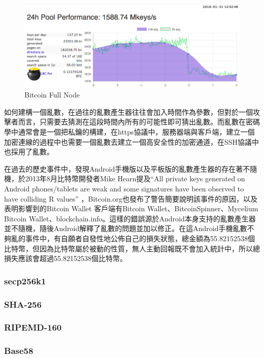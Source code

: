 			\begin{figure}[h]
				\centering
				\includegraphics[width = .9\textwidth]{LBC.png}
				\caption{Bitcoin Full Node\parencite{TheLargeBitcoinCollider}}\label{LBC}
			\end{figure}

			如何建構一個亂數，在過往的亂數產生器往往會加入時間作為參數，但對於一個攻擊者而言，只需要去猜測在這段時間內所有的可能性即可猜出亂數。而亂數在密碼學中通常會是一個把私鑰的構建，在https協議中，服務器端與客戶端，建立一個加密連線的過程中也需要一個亂數去建立一個高安全性的加密通道，在SSH協議中也採用了亂數。
	
			在過去的歷史事件中，發現Android手機版以及平板版的亂數產生器的存在著不隨機，於2013年8月比特幣開發者Mike Hearn提及“All private keys generated on Android phones/tablets are weak and some signatures have been observed to have colliding R values” \parencite{SomeSecureRandomThoughts}，Bitcoin.org也發布了警告\parencite{AndroidSecurityVulnerability}簡要說明該事件的原因，以及表明影響到的Bitcoin Wallet 客戶端有Bitcoin Wallet、BitcoinSpinner、Mycelium Bitcoin Wallet、blockchain.info。這樣的錯誤源於Android本身支持的亂數產生器並不隨機，隨後Android解釋了亂數的問題並加以修正。在這Android手機亂數不夠亂的事件中，有自願者自發性地公佈自己的損失狀態，總金額為55.82152538個比特幣\parencite{Badsignaturesleading}，但因為比特幣屬於被動的性質，無人主動回報既不會加入統計中，所以總損失應該會超過55.82152538個比特幣。

			\subsubsection{secp256k1}
			\subsubsection{SHA-256}
			\subsubsection{RIPEMD-160}
			\subsubsection{Base58}


